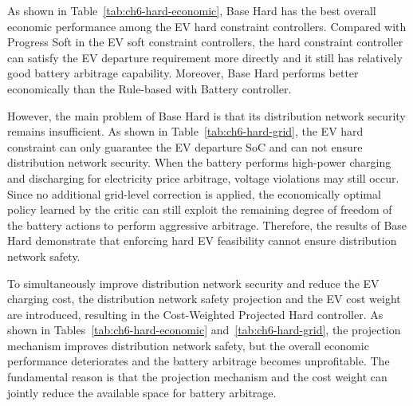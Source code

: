 As shown in Table~\ref{tab:ch6-hard-economic}, Base Hard has the best overall economic performance among the EV hard constraint controllers. Compared with Progress Soft in the EV soft constraint controllers, the hard constraint controller can satisfy the EV departure requirement more directly and it still has relatively good battery arbitrage capability. Moreover, Base Hard performs better economically than the Rule-based with Battery controller.

However, the main problem of Base Hard is that its distribution network security remains insufficient. As shown in Table~\ref{tab:ch6-hard-grid}, the EV hard constraint can only guarantee the EV departure SoC and can not ensure distribution network security. When the battery performs high-power charging and discharging for electricity price arbitrage, voltage violations may still occur. Since no additional grid-level correction is applied, the economically optimal policy learned by the critic can still exploit the remaining degree of freedom of the battery actions to perform aggressive arbitrage. Therefore, the results of Base Hard demonstrate that enforcing hard EV feasibility cannot ensure distribution network safety.

\begin{table}[htbp]
  \centering
  \caption{Grid Safety Comparison of EV Hard Constraint Controllers and Baseline Methods}
  \label{tab:ch6-hard-grid}
\end{table}

To simultaneously improve distribution network security and reduce the EV charging cost, the distribution network safety projection and the EV cost weight are introduced, resulting in the Cost-Weighted Projected Hard controller. As shown in Tables~\ref{tab:ch6-hard-economic} and~\ref{tab:ch6-hard-grid}, the projection mechanism improves distribution network safety, but the overall economic performance deteriorates and the battery arbitrage becomes unprofitable. The fundamental reason is that the projection mechanism and the cost weight can jointly reduce the available space for battery arbitrage.

